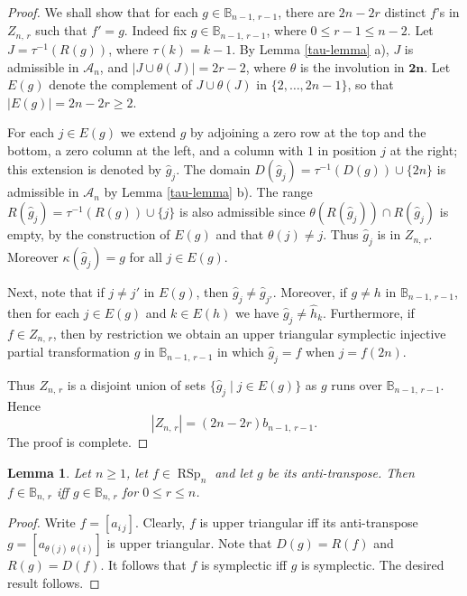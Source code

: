 \documentclass[11pt]{article}
\newtheorem{lemma}[theorem]{Lemma}
\newcommand{\ges}{\geqslant}
\newcommand{\les}{\leqslant}
\newcommand{\mb}{\mathbf}
\DeclareMathOperator{\RSp}{RSp}
\begin{document}
\begin{proof}
We shall show that for each $g\in \mathbb B_{n-1,\,r-1}$, there are $2n-2r$ distinct $f$'s in $Z_{n,\,r}$ such that $f'=g$.  Indeed fix $g\in \mathbb B_{n-1,\,r-1}$, 
where $0\les r-1\les n-2$. Let $J=\tau^{-1}(R(g))$, where $\tau(k)=k-1$.
By Lemma \ref{tau-lemma} a), $J$ is admissible in $\mathscr A_n$, and $|J\cup \theta(J)|=2r-2$, where $\theta$ is the involution 
in $\mb {2n}$. Let $E(g)$ denote the complement of $J\cup\theta(J)$ in 
$\{2,\dots, 2n-1\}$, so that $|E(g)|=2n-2r\ge 2$.  


For each  $j\in E(g)$ we extend $g$ by adjoining a zero row at the top and the bottom, a zero column at the left, and a column with $1$ in position $j$ at the right; this extension is denoted by $\hat{g}_j$. The domain
$D(\hat{g}_j)=\tau^{-1}(D(g))\cup\{2n\}$ is admissible in $\mathscr A_n$ by Lemma \ref{tau-lemma} b). The range 
$R(\hat{g}_j)=\tau^{-1}(R(g)) \cup\{j\}$
is also admissible since $\theta(R(\hat g_j))\cap R(\hat g_j)$ is empty, by the construction of $E(g)$ and that $\theta(j)\ne j$. 
Thus $ \hat g_j$ is in $Z_{n,\,r}$. Moreover $\kappa(\hat g_{j})=g$ for all $j\in E(g)$.

Next, note that if $j\ne j'$ in $E(g)$, then $ \hat g_j\ne \hat g_{j'}$.
%
Moreover, if $g\ne h$ in $\mathbb B_{n-1,\,r-1}$, then for each $j\in E(g)$ and $k\in E(h)$ we have
$ \hat g_j\ne  \hat h_k$.
%
Furthermore, if $f\in Z_{n,\,r}$, then by restriction we obtain an upper triangular symplectic injective partial transformation  $g$  in  $\mathbb B_{n-1,\,r-1}$ 
 in which $\hat g_j=f$ when $j=f(2n)$.

Thus $Z_{n,\,r}$ is a disjoint union of sets $\{ \hat g_j \mid j\in E(g)\}$ as $g$ runs over $\mathbb B_{n-1,\,r-1}$. 
Hence
\[
    |Z_{n,\,r}|=(2n-2r)b_{n-1,\,r-1}.
\]
The proof is complete. 
\end{proof}

\begin{lemma}\label{anti-diag-lemma}
Let $n\ges 1$, let $f\in \RSp_n$ and let $g$ be its anti-transpose. Then $f\in \mathbb B_{n,\,r}$  if{f} $g\in \mathbb B_{n,\,r}$ for $0\les r\les n$.
\end{lemma}
\begin{proof}
  Write $f=[a_{i\,j}].$   
  Clearly, $f$ is upper triangular if{f} its anti-transpose $g=[a_{\theta(j)\;\theta(i)}]$ is upper triangular. Note that $D(g)=R(f)$ and $R(g)=D(f)$. It follows that $f$ is symplectic if{f} $g$ is symplectic. The desired result follows.
\end{proof}
\end{document}
